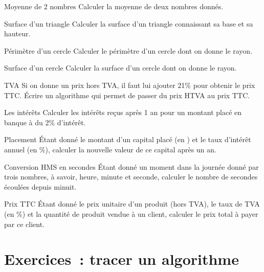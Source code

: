 \begin{Exercice}{Moyenne de 2 nombres}	
	Calculer la moyenne de deux nombres donnés.
\end{Exercice}

\begin{Exercice}{Surface d’un triangle}
	Calculer la surface d’un triangle 
	connaissant sa base et sa hauteur.
\end{Exercice}

\begin{Exercice}{Périmètre d’un cercle}
	Calculer le périmètre d’un cercle dont on donne le rayon. 
\end{Exercice}

\begin{Exercice}{Surface d’un cercle}
	Calculer la surface d’un cercle dont on donne le rayon. 
\end{Exercice}

\begin{Exercice}{TVA}
	Si on donne un prix hors TVA, il faut lui ajouter 21\% 
	pour obtenir le prix TTC. Écrire un algorithme qui permet 
	de passer du prix HTVA au prix TTC.
\end{Exercice}

\begin{Exercice}{Les intérêts}	
	Calculer les intérêts reçus après 1 an 
	pour un montant placé en banque à du 2\% d’intérêt.
\end{Exercice}

\begin{Exercice}{Placement}
	Étant donné le montant d’un capital placé (en \texteuro) 
	et le taux d’intérêt annuel (en \%), calculer la
	nouvelle valeur de ce capital après un an.
\end{Exercice}

\begin{Exercice}{Conversion HMS en secondes}
	Étant donné un moment dans la journée donné
	par trois nombres, à savoir, heure, minute et seconde, calculer le
	nombre de secondes écoulées depuis minuit.
\end{Exercice}

\begin{Exercice}{Prix TTC}
	Étant donné le prix unitaire d’un produit
	(hors TVA), le taux de TVA (en \%) 
	et la quantité de produit vendue à un client, 
	calculer le prix total à payer par ce client.
\end{Exercice}


\clearpage
\section{Exercices~: tracer un algorithme}

